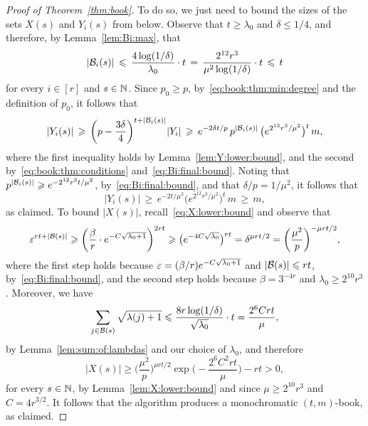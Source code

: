 \begin{proof}[Proof of Theorem~\ref{thm:book}]
To do so, we just need to bound the sizes of the sets $X(s)$ and $Y_i(s)$ from below. Observe that $t \ge \lambda_0$ and $\delta \le 1/4$, and therefore, by Lemma~\ref{lem:Bi:max}, that
\begin{equation}\label{eq:Bi:final:bound}
|\mathcal{B}_i(s)| \, \leqslant \, \frac{4 \log(1/\delta)}{\lambda_0} \cdot t \, = \, \frac{2^{12} r^3}{\mu^2 \log(1/\delta)} \cdot t \, \leqslant \, t
\end{equation}
for every $i \in [r]$ and $s \in \mathbb{N}$. Since $p_0 \ge p$, by~\eqref{eq:book:thm:min:degree} and the definition of $p_0$, it follows that  
$$|Y_i(s)| \, \geqslant \, \bigg( p - \frac{3\delta}{4} \bigg)^{t + |\mathcal{B}_i(s)|} |Y_i| \, \geqslant \, e^{-2\delta t / p} \, p^{|\mathcal{B}_i(s)|} \, \big( e^{2^{13} r^3 / \mu^2} \big)^t \, m,$$
where the first inequality holds by Lemma~\ref{lem:Y:lower:bound}, and the second by~\eqref{eq:book:thm:conditions} and~\eqref{eq:Bi:final:bound}. Noting that $p^{|\mathcal{B}_i(s)|} \geqslant e^{-2^{12} r^3 t / \mu^2}$, by~\eqref{eq:Bi:final:bound}, and that $\delta / p = 1/\mu^2$, it follows that 
$$|Y_i(s)| \, \ge \, e^{-2 t / \mu^2} \big( e^{2^{12} r^3 / \mu^2} \big)^t \, m \, \ge \, m,$$
as claimed. To bound $|X(s)|$, recall~\eqref{eq:X:lower:bound} and observe that 
$$\varepsilon^{rt + |\mathcal{B}(s)|}  \geqslant \bigg( \frac{\beta}{r} \cdot e^{- C \sqrt{\lambda_0 + 1}} \bigg)^{2rt} \geqslant \big( e^{- 4C \sqrt{\lambda_0}} \big)^{rt} = \delta^{\mu r t/2} = \bigg( \frac{\mu^2}{p} \bigg)^{-\mu r t / 2},$$
where the first step holds because $\varepsilon = (\beta / r) e^{- C \sqrt{\lambda_0 + 1}}$ and $|\mathcal{B}(s)| \leqslant rt$, by~\eqref{eq:Bi:final:bound}, and the second step holds because $\beta = 3^{-4r}$ and $\lambda_0 \ge 2^{10} r^3$. Moreover, we have
$$\sum_{j \in \mathcal{B}(s)} \sqrt{\lambda(j)+1} \leqslant \frac{8r \log(1/\delta)}{\sqrt{\lambda_0}} \cdot t = \frac{2^6Crt}{\mu},$$
by Lemma~\ref{lem:sum:of:lambdas} and our choice of $\lambda_0$, and therefore 
$$|X(s)| \ge \bigg( \frac{\mu^2}{p} \bigg)^{\mu r t / 2} \exp\bigg( - \frac{2^6C^2rt}{\mu} \bigg) - rt > 0,$$
for every $s \in \mathbb{N}$, by Lemma~\ref{lem:X:lower:bound} and since $\mu \ge 2^{10} r^3$ and $C = 4r^{3/2}$. It follows that the algorithm produces a monochromatic $(t,m)$-book, as claimed. 
\end{proof}